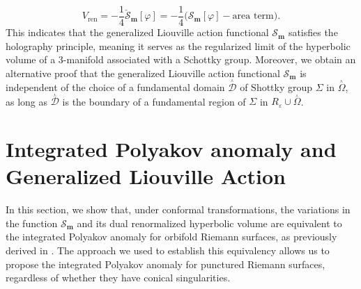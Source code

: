 \documentclass[a4paper,11pt]{article}
\newcommand{\Gpotential}{\mathscr{S}}
\newcommand{\singrigon}{\overset{{}_{\curlywedge}}{\Omega}}
\newcommand{\singfund}{\overset{{}_{\curlywedge}}{\mathcal{D}}}
\begin{document}
\begin{equation}
V_{\text{ren}} = -\frac{1}{4} \check{\mathscr{S}}_{\boldsymbol{m}}[\varphi]=-\frac{1}{4} \Big(\mathscr{S}_{\boldsymbol{m}}[\varphi]-\text{area term}\Big).\label{Theorem1}
\end{equation}
This indicates that the generalized Liouville action functional $\mathscr{S}_{\boldsymbol{m}}$  satisfies the holography principle, meaning it serves as the regularized limit of the hyperbolic volume of a 3-manifold associated with a Schottky group. Moreover, we obtain an alternative proof that the generalized Liouville action functional $\mathscr{S}_{\boldsymbol{m}}$ is independent of the choice of a fundamental domain $\singfund$ 
of Shottky group $\Sigma$ 
in $\singrigon$, as long as $\singfund$  is the boundary of a fundamental region of $\Sigma$ in 
$R_{\varepsilon}\cup \singrigon $.
\section{Integrated Polyakov anomaly and Generalized Liouville Action}\label{Section3}
In this section, we show that, under conformal transformations, the variations in the function $\Gpotential_{\boldsymbol{m}}$ and its dual renormalized hyperbolic volume are equivalent to the integrated Polyakov anomaly for orbifold Riemann surfaces, as previously derived in \cite{aldana2020polyakov}. The approach we used to establish this equivalency allows us to propose the integrated Polyakov anomaly for punctured Riemann surfaces, regardless of whether they have conical singularities.
\end{document}

